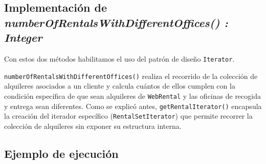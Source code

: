 \newpage %

\subsection{Implementación de \textit{numberOfRentalsWithDifferentOffices() : Integer}}

Con estos dos métodos habilitamos el uso del patrón de diseño \texttt{Iterator}.\par
\texttt{numberOfRentalsWithDifferentOffices()} realiza el recorrido de la colección de alquileres asociados a un cliente y 
calcula cuántos de ellos cumplen con la condición específica de que sean alquileres de \texttt{WebRental} y las oficinas 
de recogida y entrega sean diferentes. Como se explicó antes, \texttt{getRentalIterator()} encapsula la creación del iterador específico (\texttt{RentalSetIterator}) 
que permite recorrer la colección de alquileres sin exponer su estructura interna.

\newpage %

\subsection{Ejemplo de ejecución}


